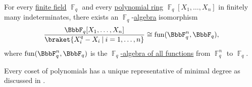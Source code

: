 \begin{proposition}\label{thm:functions_over_prime_fields}
  For every \hyperref[def:finite_field]{finite field} \( \BbbF_q \) and every \hyperref[def:polynomial_algebra]{polynomial ring} \( \BbbF_q[X_1, \ldots, X_n] \) in finitely many indeterminates, there exists an \( \BbbF_q \)-\hyperref[def:algebra_over_ring]{algebra} isomorphism
  \begin{equation*}
    \frac {\BbbF_q[X_1, \ldots, X_n]} {\braket{ X_i^q - X_i \given i = 1, \ldots, n }} \cong \fun(\BbbF_q^n, \BbbF_q),
  \end{equation*}
  where \( \fun(\BbbF_q^n, \BbbF_q) \) is the \hyperref[thm:functions_over_algebra]{\( \BbbF_q \)-algebra of all functions} from \( \BbbF
  _q^n \) to \( \BbbF_q \).
\end{proposition}
\begin{comments}
  \item Every coset of polynomials has a unique representative of minimal degree as discussed in .
\end{comments}
